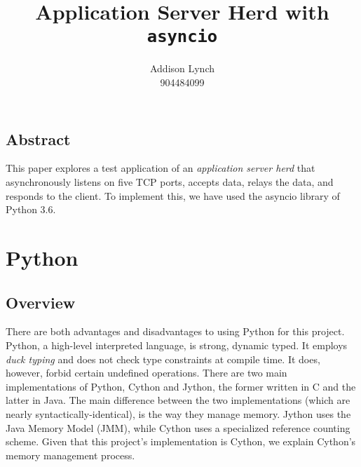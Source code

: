 \documentclass[letterpaper,twocolumn,10pt]{article}
\begin{document}
\date{}

\title{\Large \bf Application Server Herd with \texttt{asyncio}}

\author{
Addison Lynch\\
904484099
}

\maketitle

\thispagestyle{empty}


\subsection*{Abstract}

This paper explores a test application of an \textit{application server herd} that asynchronously listens on five TCP ports, accepts data, relays the data, and responds to the client. To implement this, we have used the asyncio library of Python 3.6.

\section{Python}

\subsection{Overview}

There are both advantages and disadvantages to using Python for this project. Python, a high-level interpreted language, is strong, dynamic typed. It employs \textit{duck typing} and does not check type constraints at compile time. It does, however, forbid certain undefined operations. There are two main implementations of Python, Cython and Jython, the former written in C and the latter in Java. The main difference between the two implementations (which are nearly syntactically-identical), is the way they manage memory. Jython uses the Java Memory Model (JMM), while Cython uses a specialized reference counting scheme. Given that this project's implementation is Cython, we explain Cython's memory management process. 
\end{document}
